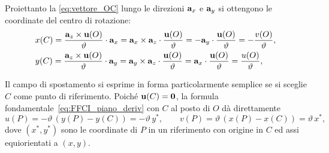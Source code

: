 Proiettanto la \eqref{eq:vettore_OC} lungo le direzioni $\mathbf{a}_x$ e $\mathbf{a}_y$ si ottengono le coordinate del centro di rotazione:
\begin{equation}\label{eq:CR_coord}
\begin{aligned}
		&x(C) =  \frac{\mathbf{a}_z \times \mathbf{u}(O)}{\vartheta}\cdot \mathbf{a}_x=\mathbf{a}_x\times\mathbf{a}_z\cdot\frac{\mathbf{u}(O)}{\vartheta}=-\mathbf{a}_y\cdot\frac{\mathbf{u}(O)}{\vartheta}=-\frac{v(O)}{\vartheta}, \\
&	y(C) =  \frac{\mathbf{a}_z \times \mathbf{u}(O)}{\vartheta}\cdot \mathbf{a}_y=\mathbf{a}_y\times\mathbf{a}_z\cdot\frac{\mathbf{u}(O)}{\vartheta}=\mathbf{a}_x\cdot\frac{\mathbf{u}(O)}{\vartheta}=\frac{u(O)}{\vartheta},
\end{aligned}
\end{equation}
%

Il campo di spostamento si
esprime in forma particolarmente semplice se si sceglie $C$
come punto di riferimento. Poiché $\mathbf{u}(C) = \mathbf{0}$, la
formula fondamentale~\eqref{eq:FFCI_piano_deriv} con $C$ al posto
di $O$ dà direttamente
\begin{equation}\label{eq:spost_da_CR}
	u(P) = -\vartheta\,(y(P) - y(C)) = -\vartheta\, y^*,
	\qquad
	v(P) = \vartheta\,(x(P) - x(C)) = \vartheta\, x^*,
\end{equation}
dove $(x^*, y^*)$ sono le coordinate di $P$ in un riferimento
con origine in $C$ ed assi equiorientati a $(x, y)$.


